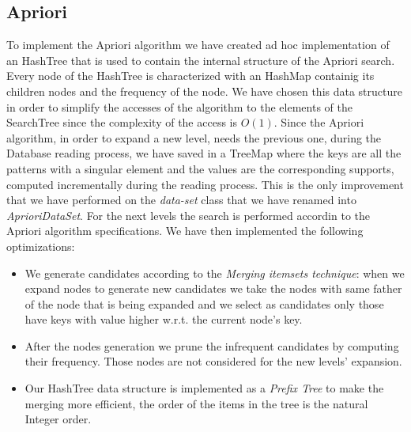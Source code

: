 \documentclass[11pt, a4paper]{article}
\begin{document}
		\subsection{Apriori}
			To implement the Apriori algorithm we have created ad hoc implementation of an HashTree that is used to contain the internal structure of the Apriori search. Every node of the HashTree is characterized with an HashMap containig its children nodes and the frequency of the node. 
			We have chosen this data structure in order to simplify the accesses of the algorithm to the elements of the SearchTree since the complexity of the access is $O(1)$.\newline
			Since the Apriori algorithm, in order to expand a new level, needs the previous one, during the Database reading process, we have saved in a TreeMap where the keys are all the patterns with a singular element and the values are the corresponding supports, computed incrementally during the reading process.\newline 
			This is the only improvement that we have performed on the \textit{data-set} class that we have renamed into \textit{AprioriDataSet}.
			For the next levels the search is performed accordin to the Apriori algorithm specifications.
			\newline \newline
			We have then implemented the following optimizations:
			\begin{itemize}
				\item We generate candidates according to the \textit{Merging itemsets technique}: when we expand nodes to generate new candidates we take the nodes with same father of the node that is being expanded and we select as candidates only those have keys with value higher w.r.t. the current node's key.
				\item After the nodes generation we prune the infrequent candidates by computing their frequency. Those nodes are not considered for the new levels' expansion.
				\item Our HashTree data structure is implemented as a \textit{Prefix Tree} to make the merging more efficient, the order of the items in the tree is the natural Integer order.
			\end{itemize}
\end{document}
